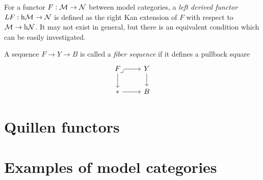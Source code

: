 \documentclass{../../large}
\begin{document}
\begin{prb}
For a functor $F:\mathcal{M}\to\mathcal{N}$ between model categories, a \emph{left derived functor} $LF:\mathrm{h}\mathcal{M}\to\mathcal{N}$ is defined as the right Kan extension of $F$ with respect to $\mathcal{M}\to\mathrm{h}\mathcal{N}$.
It may not exist in general, but there is an equivalent condition which can be easily investigated.
\end{prb}


A sequence $F\to Y\to B$ is called a \emph{fiber sequence} if it defines a pullback square
\[\begin{tikzcd}
F \rar\dar\pullback & Y \dar \\
* \rar & B
\end{tikzcd}\]


\section{Quillen functors}



\section{Examples of model categories}
\end{document}
